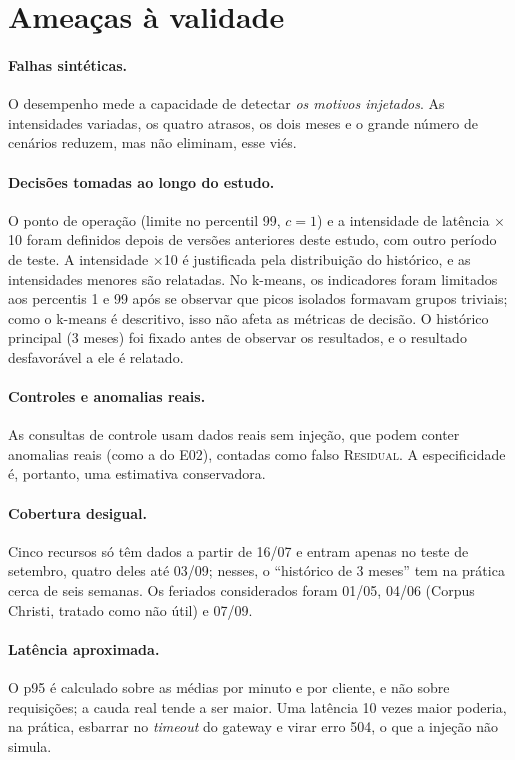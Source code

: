 \documentclass[sigconf,nonacm]{acmart}
\newcommand{\Residual}{\textsc{Residual}\xspace}
\begin{document}
\section{Ameaças à validade}\label{sec:ameacas}

\paragraph{Falhas sintéticas.} O desempenho mede a capacidade de detectar \emph{os motivos injetados}. As intensidades variadas, os quatro atrasos, os dois meses e o grande número de cenários reduzem, mas não eliminam, esse viés.

\paragraph{Decisões tomadas ao longo do estudo.} O ponto de operação (limite no percentil 99, $c=1$) e a intensidade de latência $\times$10 foram definidos depois de versões anteriores deste estudo, com outro período de teste. A intensidade $\times$10 é justificada pela distribuição do histórico, e as intensidades menores são relatadas. No k-means, os indicadores foram limitados aos percentis 1 e 99 após se observar que picos isolados formavam grupos triviais; como o k-means é descritivo, isso não afeta as métricas de decisão. O histórico principal (3 meses) foi fixado antes de observar os resultados, e o resultado desfavorável a ele é relatado.

\paragraph{Controles e anomalias reais.} As consultas de controle usam dados reais sem injeção, que podem conter anomalias reais (como a do E02), contadas como falso \Residual. A especificidade é, portanto, uma estimativa conservadora.

\paragraph{Cobertura desigual.} Cinco recursos só têm dados a partir de 16/07 e entram apenas no teste de setembro, quatro deles até 03/09; nesses, o ``histórico de 3 meses'' tem na prática cerca de seis semanas. Os feriados considerados foram 01/05, 04/06 (Corpus Christi, tratado como não útil) e 07/09.

\paragraph{Latência aproximada.} O p95 é calculado sobre as médias por minuto e por cliente, e não sobre requisições; a cauda real tende a ser maior. Uma latência 10 vezes maior poderia, na prática, esbarrar no \emph{timeout} do gateway e virar erro 504, o que a injeção não simula.
\end{document}
